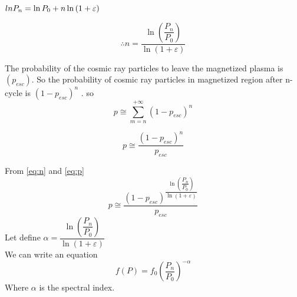 \documentclass[10pt]{article}
\begin{document}
  $\\ln{P_{n}}=\ln{P_{0}} +n\ln{\left(1+\varepsilon\right)}$\
 
 \begin{equation}
 \therefore 
  n=\dfrac{\ln{\left(\dfrac{P_{n}}{P_{0}}\right)}}{\ln{\left(1+\varepsilon\right)}}
 \label{eq:n}
 \end{equation}
 
The probability of the cosmic ray particles to leave the magnetized plasma is $\left(p_{esc}\right)$. So the probability of cosmic ray particles in magnetized region after n-cycle is $\left( 1-p_{esc}\right)^{n}$ . 
so
\begin{equation}
 p\cong\sum_{m=n}^{+\infty}\left( 1-p_{esc}\right)^{n}
 \label{eq:sump}
\end{equation} 

\begin{equation}
p\cong\dfrac{\left( 1-p_{esc}\right)^{n}}{p_{esc}}
\label{eq:p}
\end{equation}


From \ref{eq:n} and \ref{eq:p}
\begin{equation}
 p\cong\dfrac{\left( 1-p_{esc}\right)^{\dfrac{\ln{\left(\dfrac{P_{n}}{P_{0}}\right)}}{\ln{\left(1+\varepsilon\right)}}}}{p_{esc}}
\label{eq:alpha}
\end{equation}
Let define
$\alpha=\dfrac{\ln{\left(\dfrac{P_{n}}{P_{0}}\right)}}{\ln{\left(1+\varepsilon\right)}}$\ \\
 
 \label{eq:lnpn}
We can write an equation 
 \begin{equation}
 f\left(P\right)=f_{0}{\left(\dfrac{P_{n}}{P_{0}}\right)}^{-\alpha}
 \label{eq:fp}
\end{equation}  
Where $ \alpha $ is the spectral index.
\end{document}
